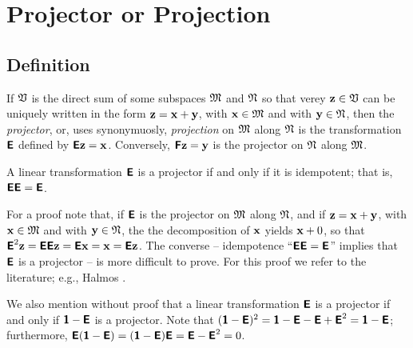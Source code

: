 \section{Projector or Projection}
\label{2011-m-projec}

\subsection{Definition}
If ${\frak V}$ is the direct sum of some subspaces
${\frak M}$
and
${\frak N}$
so that verey ${\bf z} \in {\frak V}$ can be uniquely written in the form
$
{\bf z}
=
{\bf x}
+
{\bf y}
$, with
${\bf x} \in {\frak M}$
and with
${\bf y} \in {\frak N}$,
then
the {\em projector}, or, uses synonymuosly,
{\em projection}
on ${\frak M}$
along ${\frak N}$ is the transformation $\textsf{\textbf{E}}$
defined by $\textsf{\textbf{E}}{\bf z}={\bf x}$.
Conversely,
 $\textsf{\textbf{F}}{\bf z}={\bf y}$  is the projector
on ${\frak N}$
along ${\frak M}$.

A linear transformation
$\textsf{\textbf{E}}$ is a projector if and only if
it is idempotent; that is,
$\textsf{\textbf{E}}\textsf{\textbf{E}}=\textsf{\textbf{E}}$.

{\color{OliveGreen}
\bproof
For a proof note that, if $\textsf{\textbf{E}}$  is the projector
on ${\frak M}$
along ${\frak N}$,
and if
$
{\bf z}
=
{\bf x}
+
{\bf y}
$, with
${\bf x} \in {\frak M}$
and with
${\bf y} \in {\frak N}$,
the the decomposition of ${\bf x}$ yields
${\bf x}+0$, so that
$\textsf{\textbf{E}}^2{\bf z}=\textsf{\textbf{E}}\textsf{\textbf{E}}{\bf z}=\textsf{\textbf{E}}{\bf x}
={\bf x}=\textsf{\textbf{E}}{\bf z}$.
The converse --
idempotence
``$\textsf{\textbf{E}}\textsf{\textbf{E}}=\textsf{\textbf{E}}$''
implies that $\textsf{\textbf{E}}$ is a projector -- is more difficult to prove.
For this proof we refer to the literature; e.g., Halmos \cite{halmos-vs}.
\eproof
}

We also mention without proof that a linear transformation
$\textsf{\textbf{E}}$ is a projector if and only if
$\textsf{\textbf{1}}-\textsf{\textbf{E}}$ is a projector.
Note that $(\textsf{\textbf{1}}-\textsf{\textbf{E}})^2
=\textsf{\textbf{1}}-\textsf{\textbf{E}}-\textsf{\textbf{E}}+ \textsf{\textbf{E}}^2
=\textsf{\textbf{1}}-\textsf{\textbf{E}}$;
furthermore,
$
\textsf{\textbf{E}}(\textsf{\textbf{1}}-\textsf{\textbf{E}})=
(\textsf{\textbf{1}}-\textsf{\textbf{E}})\textsf{\textbf{E}}=
\textsf{\textbf{E}}- \textsf{\textbf{E}}^2=0
$.


